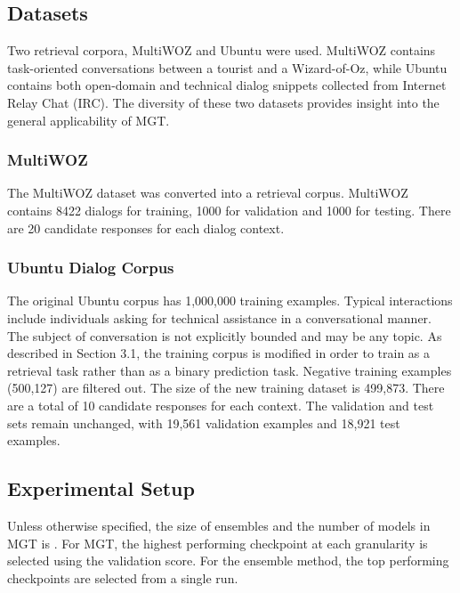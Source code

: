 \documentclass[11pt,a4paper]{article}
\begin{document}
\subsection{Datasets}

Two retrieval corpora, MultiWOZ \citep{budzianowski2018multiwoz} and Ubuntu \citep{lowe2015ubuntu} were used. MultiWOZ contains task-oriented conversations between a tourist and a Wizard-of-Oz, while Ubuntu contains both open-domain and technical dialog snippets collected from Internet Relay Chat (IRC). The diversity of these two datasets provides insight into the general applicability of MGT.

\subsubsection{MultiWOZ}

The MultiWOZ dataset \cite{budzianowski2018multiwoz} was converted into a retrieval corpus. MultiWOZ contains 8422 dialogs for training, 1000 for validation and 1000 for testing. There are 20 candidate responses for each dialog context.



\subsubsection{Ubuntu Dialog Corpus}

The original Ubuntu corpus \citep{lowe2015ubuntu} has 1,000,000 training examples. Typical interactions include individuals asking for technical assistance in a conversational manner. The subject of conversation is not explicitly bounded and may be any topic. As described in Section 3.1, the training corpus is modified in order to train as a retrieval task rather than as a binary prediction task. Negative training examples (500,127) are filtered out. The size of the new training dataset is 499,873. There are a total of 10 candidate responses for each context. The validation and test sets remain unchanged, with 19,561 validation examples and 18,921 test examples.

\subsection{Experimental Setup}

Unless otherwise specified, the size of ensembles and the number of models in MGT is . For MGT, the highest performing checkpoint at each granularity is selected using the validation score. For the ensemble method, the top performing checkpoints are selected from a single run.
\end{document}
